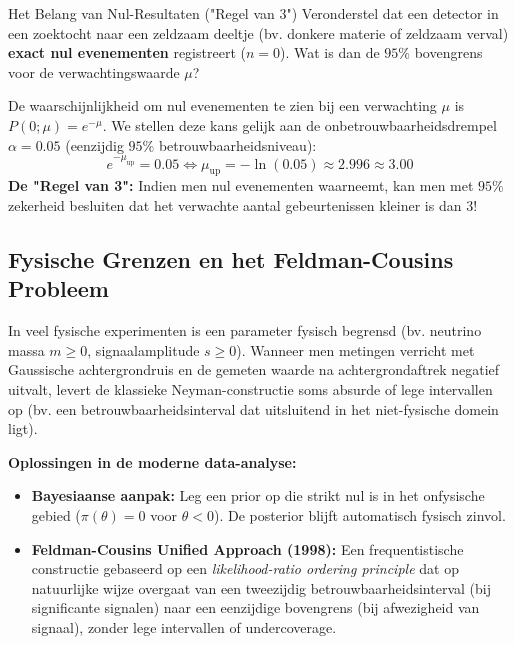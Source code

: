 \documentclass[11pt,a4paper]{article}
\begin{document}
\begin{fysicabox}{Het Belang van Nul-Resultaten ("Regel van 3")}
Veronderstel dat een detector in een zoektocht naar een zeldzaam deeltje (bv. donkere materie of zeldzaam verval) \textbf{exact nul evenementen} registreert ($n = 0$). Wat is dan de $95\%$ bovengrens voor de verwachtingswaarde $\mu$?

De waarschijnlijkheid om nul evenementen te zien bij een verwachting $\mu$ is $P(0; \mu) = e^{-\mu}$.
We stellen deze kans gelijk aan de onbetrouwbaarheidsdrempel $\alpha = 0.05$ (eenzijdig $95\%$ betrouwbaarheidsniveau):
\begin{equation}
    e^{-\mu_{\text{up}}} = 0.05 \iff \mu_{\text{up}} = -\ln(0.05) \approx 2.996 \approx 3.00
\end{equation}
\textbf{De "Regel van 3":} Indien men nul evenementen waarneemt, kan men met $95\%$ zekerheid besluiten dat het verwachte aantal gebeurtenissen kleiner is dan $3$!
\end{fysicabox}

\subsection{Fysische Grenzen en het Feldman-Cousins Probleem}
In veel fysische experimenten is een parameter fysisch begrensd (bv. neutrino massa $m \ge 0$, signaalamplitude $s \ge 0$). Wanneer men metingen verricht met Gaussische achtergrondruis en de gemeten waarde na achtergrondaftrek negatief uitvalt, levert de klassieke Neyman-constructie soms absurde of lege intervallen op (bv. een betrouwbaarheidsinterval dat uitsluitend in het niet-fysische domein ligt).

\textbf{Oplossingen in de moderne data-analyse:}
\begin{itemize}[leftmargin=1.5em]
    \item \textbf{Bayesiaanse aanpak:} Leg een prior op die strikt nul is in het onfysische gebied ($\pi(\theta) = 0$ voor $\theta < 0$). De posterior blijft automatisch fysisch zinvol.
    \item \textbf{Feldman-Cousins Unified Approach (1998):} Een frequentistische constructie gebaseerd op een \emph{likelihood-ratio ordering principle} dat op natuurlijke wijze overgaat van een tweezijdig betrouwbaarheidsinterval (bij significante signalen) naar een eenzijdige bovengrens (bij afwezigheid van signaal), zonder lege intervallen of undercoverage.
\end{itemize}

\end{document}
